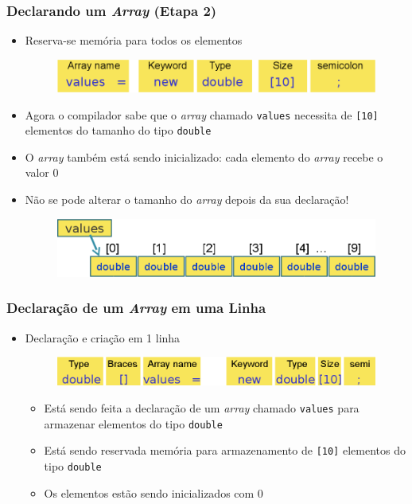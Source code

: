 \documentclass[xcolor={dvipsnames,table},aspectratio=169]{beamer}
\begin{document}
\begin{frame}\frametitle{Declarando um \emph{Array} (Etapa 2)}
\begin{itemize}
	\item Reserva-se memória para todos os elementos
\begin{figure}[h]
	\includegraphics[height=0.10\paperheight,center]{pucrs-ep-fprog-unidade_06-arrays-laminas-declaracao_etapa_2a.png}
\end{figure}
	\item Agora o compilador sabe que o \emph{array} chamado \texttt{values} necessita de \texttt{[10]} elementos do tamanho do tipo \texttt{double}
	\item O \emph{array} também está sendo inicializado: cada elemento do \emph{array} recebe o valor 0
	\item Não se pode alterar o tamanho do \emph{array} depois da sua declaração!
\begin{figure}[h]
	\includegraphics[height=0.15\paperheight,center]{pucrs-ep-fprog-unidade_06-arrays-laminas-declaracao_etapa_2b.png}
\end{figure}
\end{itemize}
\end{frame}

\begin{frame}\frametitle{Declaração de um \emph{Array} em uma Linha}
\begin{itemize}
	\item Declaração e criação em 1 linha
\begin{figure}[h]
	\includegraphics[height=0.10\paperheight,center]{pucrs-ep-fprog-unidade_06-arrays-laminas-declaracao_1_linha.png}
\end{figure}
	\begin{itemize}
		\item Está sendo feita a declaração de um \emph{array} chamado \texttt{values} para armazenar elementos do tipo \texttt{double}
		\item Está sendo reservada memória para armazenamento de \texttt{[10]} elementos do  tipo \texttt{double}
		\item Os elementos estão sendo inicializados com 0
	\end{itemize}
\end{itemize}
\end{frame}
\end{document}

